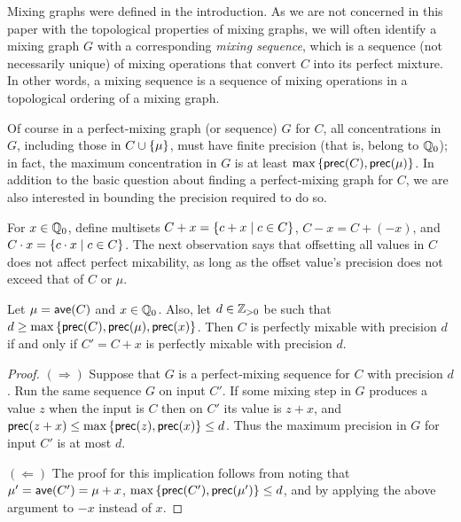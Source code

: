 Mixing graphs were defined in the introduction. As we are not concerned in this paper with the
topological properties of mixing graphs, we will often identify a mixing graph $G$ with a
corresponding \emph{mixing sequence}, which is a sequence (not necessarily unique) of mixing operations
that convert $C$ into its perfect mixture. In other words, a mixing sequence is a sequence
of mixing operations in a topological ordering of a mixing graph.

Of course in a perfect-mixing graph (or sequence) $G$ for $C$, all concentrations in $G$,
including those in $C\cup{ \left\{ \mu \right\} }$,
must have finite precision (that is, belong to ${\mathbb Q}_0$);
in fact, the maximum concentration in $G$ is at least $\max{ \left\{ {\textsf{prec}}(C),{\textsf{prec}}(\mu) \right\} }$.
In addition to the basic question about finding a perfect-mixing graph for $C$, 
we are also interested in bounding the precision required to do so.

For $x\in{\mathbb Q}_0$, define multisets $C+x = { \left\{ c+x \mid c\in C \right\} }$,
$C-x = C+(-x)$, and $C\cdot x = { \left\{ c\cdot x \mid c\in C \right\} }$.
The next observation says that offsetting all values in $C$
does not affect perfect mixability, as long as the offset value's precision
does not exceed that of $C$ or $\mu$.

\begin{observation}%
\label{obs: offsetting does not affect reachability}
Let $\mu = {\textsf{ave}}(C)$ and $x\in{\mathbb Q}_0$. 
Also, let $d\in{\mathbb{Z}_{> 0}}$ be such that $d\ge \max{ \left\{ {\textsf{prec}}(C),{\textsf{prec}}(\mu),{\textsf{prec}}(x) \right\} }$.
Then $C$ is perfectly mixable with precision $d$ if and only if
$C' = C+x$ is perfectly mixable with precision $d$.
\end{observation}%

\begin{proof}
$(\Rightarrow)$
Suppose that $G$ is a perfect-mixing sequence for $C$ with precision $d$.
Run the same sequence $G$ on input $C'$. If some mixing step in $G$ produces a value $z$ when
the input is $C$ then on $C'$ its value is $z+x$,
and ${\textsf{prec}}(z+x)\le \max{ \left\{ {\textsf{prec}}(z),{\textsf{prec}}(x) \right\} } \le d$.
Thus the maximum precision in $G$ for input $C'$ is at most $d$. 

$(\Leftarrow)$
The proof for this implication follows from noting that
$\mu' = {\textsf{ave}}(C') = \mu+x$,
$\max{ \left\{ {\textsf{prec}}(C'),{\textsf{prec}}(\mu') \right\} }\le d$, and by applying the
above argument to $-x$ instead of $x$.
\end{proof}

